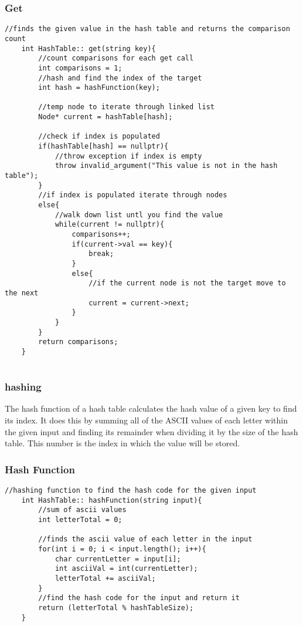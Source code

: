 \documentclass[letterpaper, 10pt,DIV=13]{scrartcl}
\numberwithin{equation}{section} %
\numberwithin{figure}{section} %
\numberwithin{table}{section} %
\begin{document}
\subsubsection*{Get}
    \lstset{numbers=left, numberstyle=\tiny, stepnumber=1, numbersep=5pt, basicstyle=\footnotesize\ttfamily}
    \begin{lstlisting}[frame=single, ]
    //finds the given value in the hash table and returns the comparison count
    int HashTable:: get(string key){
        //count comparisons for each get call
        int comparisons = 1;
        //hash and find the index of the target
        int hash = hashFunction(key);
    
        //temp node to iterate through linked list
        Node* current = hashTable[hash];
    
        //check if index is populated
        if(hashTable[hash] == nullptr){
            //throw exception if index is empty
            throw invalid_argument("This value is not in the hash table");
        }
        //if index is populated iterate through nodes
        else{
            //walk down list untl you find the value
            while(current != nullptr){
                comparisons++;
                if(current->val == key){
                    break;
                }
                else{
                    //if the current node is not the target move to the next
                    current = current->next;
                }
            }
        }
        return comparisons;
    }
    
\end{lstlisting}

\subsubsection{hashing}
The hash function of a hash table calculates the hash value of a given key to find its index. It does this by summing all of the ASCII values of each letter within the given input and finding its remainder when dividing it by the size of the hash table. This number is the index in which the value will be stored.

\pagebreak

\subsubsection*{Hash Function}
    \lstset{numbers=left, numberstyle=\tiny, stepnumber=1, numbersep=5pt, basicstyle=\footnotesize\ttfamily}
    \begin{lstlisting}[frame=single, ]
    //hashing function to find the hash code for the given input
    int HashTable:: hashFunction(string input){
        //sum of ascii values
        int letterTotal = 0; 
    
        //finds the ascii value of each letter in the input
        for(int i = 0; i < input.length(); i++){
            char currentLetter = input[i];
            int asciiVal = int(currentLetter);
            letterTotal += asciiVal;
        }
        //find the hash code for the input and return it
        return (letterTotal % hashTableSize);
    }
    
\end{lstlisting}
\end{document}
